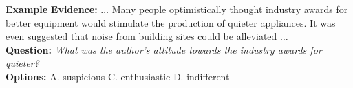 \begin{block}{{\color{mLightGreen}\textbf{Example}} }
  \textbf{Evidence:} $\ldots$ Many people optimistically thought industry awards for better equipment would stimulate the production of quieter appliances. It was even suggested that noise from building sites could be alleviated $\ldots$ \\
  \textbf{Question:} \textit{What was the author’s attitude towards the industry awards for quieter?} \\
  \textbf{Options:} A. {\color{mLightGreen}suspicious} C. enthusiastic D. indifferent
\end{block}

